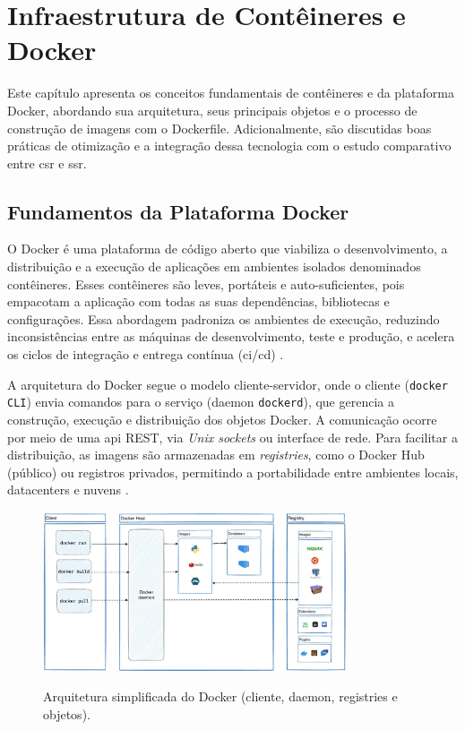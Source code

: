 \section{Infraestrutura de Contêineres e Docker}
\label{cap:docker}

Este capítulo apresenta os conceitos fundamentais de contêineres e da plataforma Docker, abordando sua arquitetura, seus principais objetos e o processo de construção de imagens com o Dockerfile. Adicionalmente, são discutidas boas práticas de otimização e a integração dessa tecnologia com o estudo comparativo entre \acrshort{csr} e \acrshort{ssr}. \cite{docker_overview,dockerfile_ref}

\subsection{Fundamentos da Plataforma Docker}
\label{sec:docker-fundamentos}

O Docker é uma plataforma de código aberto que viabiliza o desenvolvimento, a distribuição e a execução de aplicações em ambientes isolados denominados contêineres. Esses contêineres são leves, portáteis e auto-suficientes, pois empacotam a aplicação com todas as suas dependências, bibliotecas e configurações. Essa abordagem padroniza os ambientes de execução, reduzindo inconsistências entre as máquinas de desenvolvimento, teste e produção, e acelera os ciclos de integração e entrega contínua (\acrshort{ci}/\acrshort{cd}) \cite{docker_overview}.

A arquitetura do Docker segue o modelo cliente-servidor, onde o cliente (\texttt{docker CLI}) envia comandos para o serviço (daemon \texttt{dockerd}), que gerencia a construção, execução e distribuição dos objetos Docker. A comunicação ocorre por meio de uma \acrshort{api} REST, via \textit{Unix sockets} ou interface de rede. Para facilitar a distribuição, as imagens são armazenadas em \textit{registries}, como o Docker Hub (público) ou registros privados, permitindo a portabilidade entre ambientes locais, datacenters e nuvens \cite{docker_overview}.

\begin{figure}[H]
  \centering
  \caption{Arquitetura simplificada do Docker (cliente, daemon, registries e objetos).}
  \includegraphics[width=0.8\textwidth]{media/docker_architecture.png}
  \label{fig:docker-arquitetura}
\end{figure}

